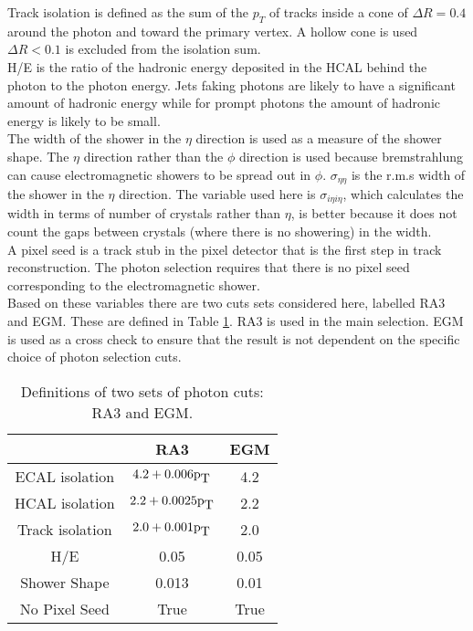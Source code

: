 Track isolation is defined as the sum of the $p_{T}$ of tracks inside a cone of
$\Delta R = 0.4$ around the photon and toward the primary vertex. A hollow cone 
is used $\Delta R < 0.1$ is excluded from the isolation sum. \\

H/E is the ratio of the hadronic energy deposited in the HCAL behind the photon
to the photon energy. Jets faking photons are likely to have a significant 
amount of hadronic energy while for prompt photons the amount of hadronic energy
is likely to be small. \\

The width of the shower in the $\eta$ direction is used as a measure of the
shower shape. The $\eta$ direction rather than the $\phi$ direction is used 
because bremstrahlung can cause electromagnetic showers to be spread out in 
$\phi$. $\sigma_{\eta\eta}$ is the r.m.s width of the shower in the $\eta$ 
direction. The variable used here is $\sigma_{i\eta i\eta}$, which calculates 
the width in terms of number of crystals rather than $\eta$, is better because 
it does not count the gaps between crystals (where there is no showering) in the
width. \\

A pixel seed is a track stub in the pixel detector that is the first step in
track reconstruction. The photon selection requires that there is no pixel seed
corresponding to the electromagnetic shower. \\

Based on these variables there are two cuts sets considered here, labelled  RA3
and EGM. These are defined in Table \ref{tab:photoncuts}. RA3 is used in the 
main selection. EGM is used as a cross check to ensure that the result is not 
dependent on the specific choice of photon selection cuts.

\begin{table}
\begin{center}
\begin{tabular}{|c|c|c|}
\hline
 & RA3 & EGM \\
\hline
ECAL isolation & $4.2 + 0.006\mbox{p}_{\mbox{T}}$ & 4.2 \\
\hline
HCAL isolation & $2.2 + 0.0025\mbox{p}_{\mbox{T}}$ & 2.2 \\
\hline
Track isolation & $2.0 + 0.001\mbox{p}_{\mbox{T}}$ & 2.0 \\
\hline
H/E & 0.05 & 0.05 \\
\hline
Shower Shape & 0.013 & 0.01 \\
\hline
No Pixel Seed & True & True \\
\hline
\end{tabular}
\end{center}
\caption{Definitions of two sets of photon cuts: RA3 and EGM.}
\label{tab:photoncuts}
\end{table}


